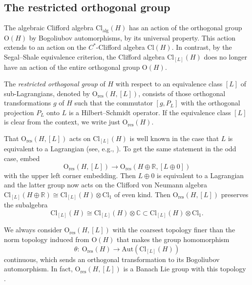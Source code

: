 \documentclass[11pt]{article}
\numberwithin{equation}{section}
\numberwithin{equation}{section}
\newcommand{\R}{\mathbb{R}}
\newcommand{\C}{\mathbb{C}}
\newcommand{\Cl}{\mathrm{Cl}}
\newcommand{\res}{\mathrm{res}}
\newcommand{\Aut}{\mathrm{Aut}}
\renewcommand{\O}{\mathrm{O}}
\begin{document}
\subsection{The restricted orthogonal group}

The algebraic Clifford algebra $\Cl_{\mathrm{alg}}(H)$ has an action of the orthogonal group $\O(H)$ by Bogoliubov automorphisms, by its universal property.
This action extends to an action on the $C^*$-Clifford algebra $\Cl(H)$.
In contrast, by the Segal--Shale equivalence criterion, the Clifford algebra $\Cl_{[L]}(H)$ does no longer have an action of the entire orthogonal group $\O(H)$.

\begin{Definition}
The \emph{restricted orthogonal group} of $H$ with respect to an equivalence class $[L]$ of sub-Lagrangians, denoted by $\O_{\res}(H, [L])$, consists of those orthogonal transformations $g$ of $H$ such that the commutator $[g, P_L]$ with the orthogonal projection $P_L$ onto $L$ is a Hilbert--Schmidt operator.
If the equivalence class $[L]$ is clear from the context, we write just $\O_{\res}(H)$.
\end{Definition}

That $\O_{\res}(H, [L])$ acts on $\Cl_{[L]}(H)$ is well known in the case that $L$ is equivalent to a Lagrangian (see, e.g., \cite[Section~6]{Araki1}).
To get the same statement in the odd case, embed
\begin{equation*}
\O_{\res}(H, [L]) \longrightarrow \O_{\res}(H \oplus \R, [L \oplus 0])
\end{equation*}
 with the upper left corner embedding.
 Then $L \oplus 0$ is equivalent to a Lagrangian and the latter group now acts on the Clifford von Neumann algebra $\Cl_{[L]}(H \oplus \R) \cong \Cl_{[L]}(H) \otimes \Cl_1$ of even kind.
 Then $\O_{\res}(H, [L])$ preserves the subalgebra
 \begin{equation*}
 \Cl_{[L]}(H) \cong \Cl_{[L]}(H) \otimes \C \subset \Cl_{[L]}(H)\otimes \Cl_1.
\end{equation*}

We always consider $\O_{\res}(H, [L])$ with the coarsest topology finer than the norm topology induced from $\O(H)$ that makes the group homomorphism
\begin{equation} \label{vonNeumannBogoliubovMap}
 \theta\colon\ \O_{\res}(H) \to \Aut(\Cl_{[L]}(H))
\end{equation}
continuous, which sends an orthogonal transformation to its Bogoliubov automorphism.
In fact, $\O_{\res}(H, [L])$ is a Banach Lie group with this topology \cite[Sections~6.2 and~2.4]{PressleySegal}.
\end{document}
